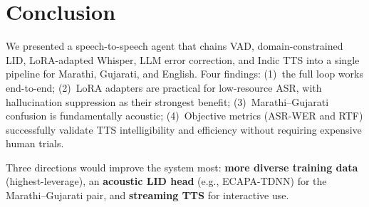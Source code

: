 \documentclass[11pt]{article}
\begin{document}
\section{Conclusion}

We presented a speech-to-speech agent that chains VAD, domain-constrained LID, LoRA-adapted Whisper, LLM error correction, and Indic TTS into a single pipeline for Marathi, Gujarati, and English.  Four findings: (1)~the full loop works end-to-end; (2)~LoRA adapters are practical for low-resource ASR, with hallucination suppression as their strongest benefit; (3)~Marathi--Gujarati confusion is fundamentally acoustic; (4)~Objective metrics (ASR-WER and RTF) successfully validate TTS intelligibility and efficiency without requiring expensive human trials.

Three directions would improve the system most: \textbf{more diverse training data} (highest-leverage), an \textbf{acoustic LID head} (e.g., ECAPA-TDNN) for the Marathi--Gujarati pair, and \textbf{streaming TTS} for interactive use.


\end{document}

